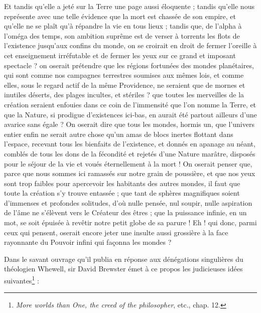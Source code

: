 \documentclass[a4paper, 11pt, oneside, landscape]{article}
\begin{document}
Et tandis qu'elle a jeté sur la Terre une page aussi éloquente ; tandis qu'elle nous représente avec une telle évidence que la mort est chassée de son empire, et qu'elle ne se plaît qu'à répandre la vie en tous lieux ; tandis que, de l'alpha à l'oméga des temps, son ambition suprême est de verser à torrents les flots de l'existence jusqu'aux confins du monde, on se croirait en droit de fermer l'oreille à cet enseignement irréfutable et de fermer les yeux sur ce grand et imposant spectacle ? on oserait prétendre que les régions fortunées des mondes planétaires, qui sont comme nos campagnes terrestres soumises aux mêmes lois, et comme elles, sous le regard actif de la même Providence, ne seraient que de mornes et inutiles déserts, des plages incultes, et stériles ? que toutes les merveilles de la création seraient enfouies dans ce coin de l'immensité que l'on nomme la Terre, et que la Nature, si prodigue d'existences ici-bas, en aurait été partout ailleurs d'une avarice sans égale ? On oserait dire que tous les mondes, hormis un, que l'univers entier enfin ne serait autre chose qu'un amas de blocs inertes flottant dans l'espace, recevant tous les bienfaits de l'existence, et donnés en apanage au néant, comblés de tous les dons de la fécondité et rejetés d'une Nature marâtre, disposés pour le séjour de la vie et voués éternellement à la mort ! On oserait penser que, parce que nous sommes ici ramassés sur notre grain de poussière, et que nos yeux sont trop faibles pour apercevoir les habitants des autres mondes, il faut que toute la création s'y trouve entassée ; que tant de sphères magnifiques soient d'immenses et profondes solitudes, d'où nulle pensée, nul soupir, nulle aspiration de l'âme ne s'élèvent vers le Créateur des êtres ; que la puissance infinie, en un mot, se soit épuisée à revêtir notre petit globe de sa parure ! Eh ! qui donc, parmi ceux qui pensent, oserait encore jeter une insulte aussi grossière à la face rayonnante du Pouvoir infini qui façonna les mondes ?

Dans le savant ouvrage qu'il publia en réponse aux dénégations singulières du théologien Whewell, sir David Brewster émet à ce propos les judicieuses idées suivantes\footnote{\emph{More worlds than One, the creed of the philosopher}, etc., chap. 12.} :
\end{document}
